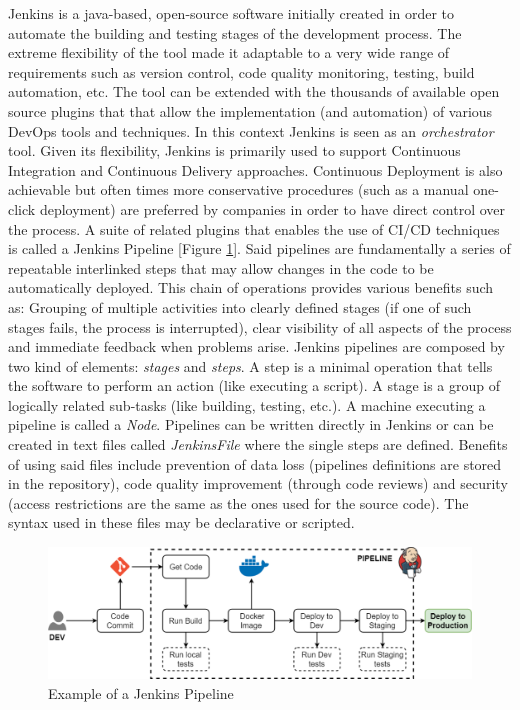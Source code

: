 Jenkins \cite{JenkinsGuide} is a java-based, open-source software initially created in order to automate the building and testing stages of the development process. The extreme flexibility of the tool made it adaptable to a very wide range of requirements such as version control, code quality monitoring, testing, build automation, etc.
The tool can be extended with the thousands of available open source plugins that that allow the implementation (and automation) of various DevOps tools and techniques. In this context Jenkins is seen as an \textit{orchestrator} tool.
Given its flexibility, Jenkins is primarily used to support Continuous Integration and Continuous Delivery approaches. Continuous Deployment is also achievable but often times more conservative procedures (such as a manual one-click deployment) are preferred by companies in order to have direct control over the process. A suite of related plugins that enables the use of CI/CD techniques is called a Jenkins Pipeline [Figure \ref{fig:jenkinsPipeline}]. Said pipelines are fundamentally a series of repeatable interlinked steps that may allow changes in the code to be automatically deployed. 
This chain of operations provides various benefits such as: Grouping of  multiple activities into clearly defined stages (if one of such stages fails, the process is interrupted), clear visibility of all aspects of the process and immediate feedback when problems arise.
Jenkins pipelines are composed by two kind of elements: \textit{stages} and \textit{steps}. A step is a minimal operation that tells the software to perform an action (like executing a script). A stage is a group of logically related sub-tasks (like building, testing, etc.). A machine executing a pipeline is called a \textit{Node}. Pipelines can be written directly in Jenkins or can be created in text files called \textit{JenkinsFile} where the single steps are defined.
Benefits of using said files include prevention of data loss (pipelines definitions are stored in the repository), code quality improvement (through code reviews) and security (access restrictions are the same as the ones used for the source code). The syntax used in these files may be declarative or scripted.


\begin{figure}[ht]
	\centering
	\includegraphics[scale=0.5]{Images/JenkisPipeline.pdf}
	\caption{Example of a Jenkins Pipeline}
	\label{fig:jenkinsPipeline}
\end{figure}

